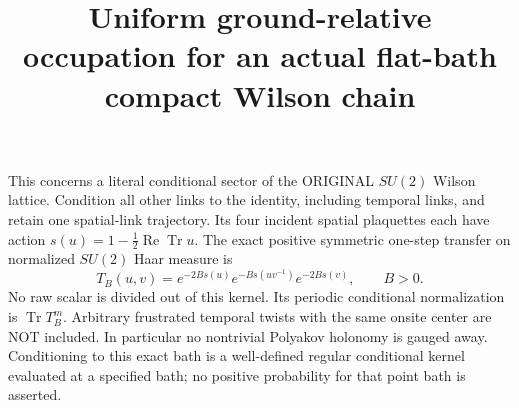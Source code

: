 \documentclass{article}
\title{Uniform ground-relative occupation for an actual flat-bath compact Wilson chain}\author{}\date{}
\begin{document}
\maketitle
This concerns a literal conditional sector of the ORIGINAL $SU(2)$ Wilson lattice. Condition all other links to the identity, including temporal links, and retain one spatial-link trajectory. Its four incident spatial plaquettes each have action $s(u)=1-\frac12\operatorname{Re}\operatorname{Tr}u$. The exact positive symmetric one-step transfer on normalized $SU(2)$ Haar measure is
\[
 T_B(u,v)=e^{-2Bs(u)}e^{-Bs(uv^{-1})}e^{-2Bs(v)},\qquad B>0.\tag{1}
\]
No raw scalar is divided out of this kernel. Its periodic conditional normalization is $\operatorname{Tr}T_B^m$. Arbitrary frustrated temporal twists with the same onsite center are NOT included. In particular no nontrivial Polyakov holonomy is gauged away. Conditioning to this exact bath is a well-defined regular conditional kernel evaluated at a specified bath; no positive probability for that point bath is asserted.
\end{document}

